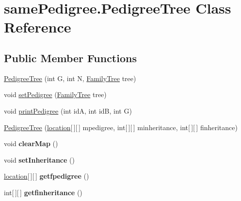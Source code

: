 \hypertarget{classsame_pedigree_1_1_pedigree_tree}{}\section{same\+Pedigree.\+Pedigree\+Tree Class Reference}
\label{classsame_pedigree_1_1_pedigree_tree}
\subsection*{Public Member Functions}
\begin{DoxyCompactItemize}
\item 
\hyperlink{classsame_pedigree_1_1_pedigree_tree_ae779dfbec01c88394c6fbc2e179ba23b}{Pedigree\+Tree} (int G, int N, \hyperlink{classbase_model_1_1_family_tree}{Family\+Tree} tree)
\item 
void \hyperlink{classsame_pedigree_1_1_pedigree_tree_a525ca01ac5df55c13b02fcc9e8494845}{set\+Pedigree} (\hyperlink{classbase_model_1_1_family_tree}{Family\+Tree} tree)
\item 
void \hyperlink{classsame_pedigree_1_1_pedigree_tree_a1dd149d02432faec54b1c4a853a10df1}{print\+Pedigree} (int id\+A, int id\+B, int G)
\item 
\hyperlink{classsame_pedigree_1_1_pedigree_tree_a8b25e57b5651b5f40c52df71abd07b71}{Pedigree\+Tree} (\hyperlink{classbase_model_1_1location}{location}\mbox{[}$\,$\mbox{]}\mbox{[}$\,$\mbox{]} mpedigree, int\mbox{[}$\,$\mbox{]}\mbox{[}$\,$\mbox{]} minheritance, int\mbox{[}$\,$\mbox{]}\mbox{[}$\,$\mbox{]} finheritance)
\item 
\hypertarget{classsame_pedigree_1_1_pedigree_tree_a926213be2209bc0e6b888f57c93d8783}{}void {\bfseries clear\+Map} ()\label{classsame_pedigree_1_1_pedigree_tree_a926213be2209bc0e6b888f57c93d8783}

\item 
\hypertarget{classsame_pedigree_1_1_pedigree_tree_a6266c2909cea2625f83bbbb31d956301}{}void {\bfseries set\+Inheritance} ()\label{classsame_pedigree_1_1_pedigree_tree_a6266c2909cea2625f83bbbb31d956301}

\item 
\hypertarget{classsame_pedigree_1_1_pedigree_tree_ac21a029265db937a07cd19e6f1c1cc1a}{}\hyperlink{classbase_model_1_1location}{location}\mbox{[}$\,$\mbox{]}\mbox{[}$\,$\mbox{]} {\bfseries getfpedigree} ()\label{classsame_pedigree_1_1_pedigree_tree_ac21a029265db937a07cd19e6f1c1cc1a}

\item 
\hypertarget{classsame_pedigree_1_1_pedigree_tree_ac6368afa041228271e8eed2f89866a20}{}int\mbox{[}$\,$\mbox{]}\mbox{[}$\,$\mbox{]} {\bfseries getfinheritance} ()\label{classsame_pedigree_1_1_pedigree_tree_ac6368afa041228271e8eed2f89866a20}


\end{DoxyCompactItemize}
